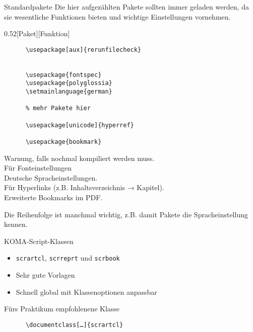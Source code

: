 \begin{frame}[fragile]{Standardpakete}
  Die hier aufgezählten Pakete sollten immer geladen werden, da sie wesentliche Funktionen bieten und wichtige Einstellungen vornehmen.
  \vspace{-1em}
  \begin{CodeExplanation}{0.52}[Paket][Funktion]
    \begin{lstlisting}
      \usepackage[aux]{rerunfilecheck}


      \usepackage{fontspec}
      \usepackage{polyglossia}
      \setmainlanguage{german}

      % mehr Pakete hier

      \usepackage[unicode]{hyperref}

      \usepackage{bookmark}
    \end{lstlisting}
  \Explanation
    \vspace{0.5\baselineskip}
    \strut
    Warnung, falls nochmal kompiliert werden muss. \\[\baselineskip]
    Für Fonteinstellungen \\[\baselineskip]
    Deutsche Spracheinstellungen. \\[3\baselineskip]
    Für Hyperlinks (z.B. Inhaltsverzeichnis → Kapitel). \\
    Erweiterte Bookmarks im PDF.
  \end{CodeExplanation}
  Die Reihenfolge ist manchmal wichtig, z.B. damit Pakete die Spracheinstellung kennen.
\end{frame}

\begin{frame}[fragile]{
  KOMA-Script-Klassen
  \hfill
}
  \begin{itemize}
    \item \texttt{scrartcl}, \texttt{scrreprt} und \texttt{scrbook}
    \item Sehr gute Vorlagen
    \item Schnell global mit Klassenoptionen anpassbar
  \end{itemize}
  \begin{block}{Fürs Praktikum empfohlenene Klasse}
    \begin{lstlisting}
      \documentclass[…]{scrartcl}
    \end{lstlisting}
  \end{block}
\end{frame}

